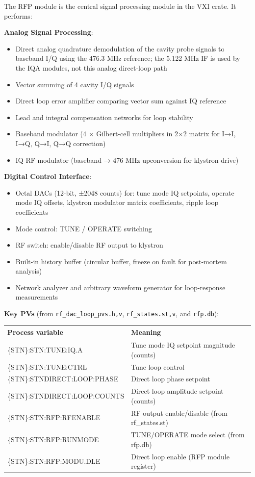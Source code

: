 The RFP module is the central signal processing module in the VXI crate. It performs:

\textbf{Analog Signal Processing}:

\begin{itemize}
\tightlist
\item
  Direct analog quadrature demodulation of the cavity probe signals to baseband I/Q using the 476.3 MHz reference; the 5.122 MHz IF is used by the IQA modules, not this analog direct-loop path 
\item
  Vector summing of 4 cavity I/Q signals
\item
  Direct loop error amplifier comparing vector sum against IQ reference
\item
  Lead and integral compensation networks for loop stability
\item
  Baseband modulator (4 × Gilbert-cell multipliers in 2×2 matrix for I→I, I→Q, Q→I, Q→Q correction)
\item
  IQ RF modulator (baseband → 476 MHz upconversion for klystron drive)
\end{itemize}

\textbf{Digital Control Interface}:

\begin{itemize}
\tightlist
\item
  Octal DACs (12-bit, ±2048 counts) for: tune mode IQ setpoints, operate mode IQ offsets, klystron modulator matrix coefficients, ripple loop coefficients
\item
  Mode control: TUNE / OPERATE switching
\item
  RF switch: enable/disable RF output to klystron
\item
  Built-in history buffer (circular buffer, freeze on fault for post-mortem analysis)
\item
  Network analyzer and arbitrary waveform generator for loop-response measurements 
\end{itemize}

\textbf{Key PVs} (from \texttt{rf\_dac\_loop\_pvs.h,v}, \texttt{rf\_states.st,v}, and \texttt{rfp.db}):

\begin{center}\small
\begin{tabular}{@{}>{\ttfamily}l l@{}}
\toprule
\normalfont Process variable & Meaning \\
\midrule
\{STN\}:STN:TUNE:IQ.A & Tune mode IQ setpoint magnitude (counts) \\
\{STN\}:STN:TUNE:CTRL & Tune loop control \\
\{STN\}:STNDIRECT:LOOP:PHASE & Direct loop phase setpoint \\
\{STN\}:STNDIRECT:LOOP:COUNTS & Direct loop amplitude setpoint (counts) \\
\{STN\}:STN:RFP:RFENABLE & RF output enable/disable (from rf\_states.st) \\
\{STN\}:STN:RFP:RUNMODE & TUNE/OPERATE mode select (from rfp.db) \\
\{STN\}:STN:RFP:MODU.DLE & Direct loop enable (RFP module register) \\
\bottomrule
\end{tabular}
\end{center}


